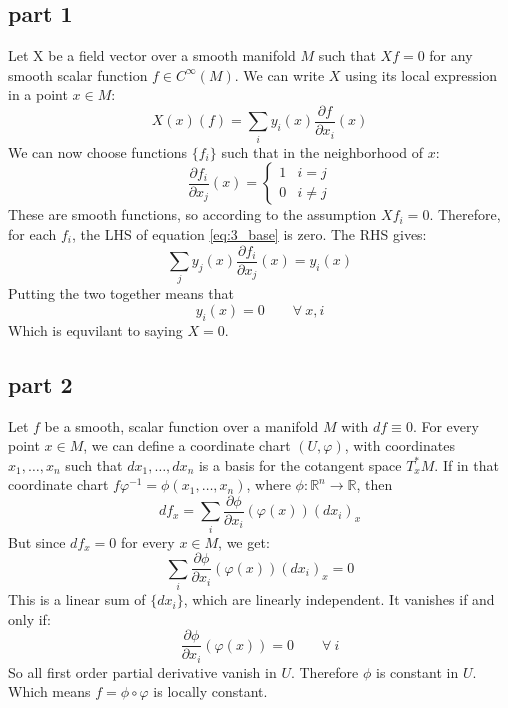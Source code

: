 \documentclass{article}
\newcommand{\R}{\ensuremath{\mathbb{R}}}
\begin{document}
\subsection*{part 1}
Let X be a field vector over a smooth manifold $M$ such that $Xf = 0$ for any smooth scalar function $f \in C^\infty(M)$. We can write $X$ using its local expression in a point $x \in M$:
\begin{equation}
\label{eq:3_base}
    X(x)(f) = \sum_i y_i(x)\frac{\partial f}{\partial x_i}(x)
\end{equation}
We can now choose functions $\{f_i\}$ such that in the neighborhood of $x$:
\begin{equation}
    \frac{\partial f_i}{\partial x_j}(x) = \begin{cases}
        1 & i = j \\ 0 & i \ne j
    \end{cases}
\end{equation}
These are smooth functions, so according to the assumption $X f_i = 0$. Therefore, for each $f_i$, the LHS of equation \ref{eq:3_base} is zero. The RHS gives:
\begin{equation}
    \sum_j y_j(x)\frac{\partial f_i}{\partial x_j}(x) = y_i(x)
\end{equation}
Putting the two together means that
\begin{equation}
    y_i(x) = 0 \qquad \forall \ x, i
\end{equation}
Which is equvilant to saying $X = 0$.
\subsection*{part 2}
Let $f$ be a smooth, scalar function over a manifold $M$ with $df \equiv 0$. For every point $x \in M$, we can define a coordinate chart $(U, \varphi)$, with coordinates $x_1, \dots, x_n$ such that $dx_1, \dots, dx_n$ is a basis for the cotangent space $T^*_xM$. If in that coordinate chart $f\varphi^{-1} = \phi(x_1,\dots,x_n)$, where $\phi: \R^n \rightarrow \R$, then
\begin{equation}
    df_x = \sum_i \frac{\partial\phi}{\partial x_i}(\varphi(x))(dx_i)_x 
\end{equation}
But since $df_x = 0$ for every $x \in M$, we get:
\begin{equation}
    \sum_i \frac{\partial\phi}{\partial x_i}(\varphi(x))(dx_i)_x  = 0
\end{equation}
This is a linear sum of $\{dx_i\}$, which are linearly independent. It vanishes if and only if:
\begin{equation}
    \frac{\partial\phi}{\partial x_i}(\varphi(x)) = 0 \qquad \forall \ i
\end{equation}
So all first order partial derivative vanish in $U$. Therefore $\phi$ is constant in $U$. Which means $f = \phi\circ\varphi$ is locally constant.
\end{document}
